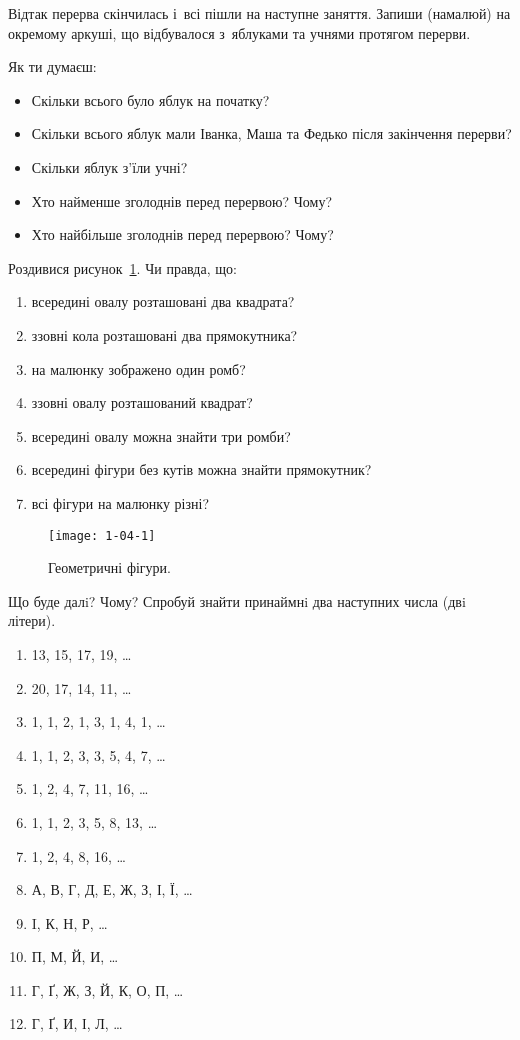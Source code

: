 Відтак перерва скінчилась і~всі пішли на наступне заняття.
Запиши (намалюй) на окремому аркуші, що відбувалося з~яблуками
та учнями протягом перерви.

Як ти думаєш:
\begin{itemize}
  \item Скільки всього було яблук на початку?
  \item Скільки всього яблук мали Іванка, Маша та Федько
  після закінчення перерви?
  \item Скільки яблук з'їли учні?
  \item Хто найменше зголоднів перед перервою? Чому?
  \item Хто найбільше зголоднів перед перервою? Чому?
\end{itemize}


\problem
Роздивися рисунок~\ref{fig:geom-figures}.
Чи правда, що:
\begin{enumerate}
  \item всередині овалу розташовані два квадрата?
  \item ззовні кола розташовані два прямокутника?
  \item на малюнку зображено один ромб?
  \item ззовні овалу розташований квадрат?
  \item всередині овалу можна знайти три ромби?
  \item всередині фігури без кутів можна знайти прямокутник?
  \item всі фігури на малюнку різні?
\end{enumerate}

\begin{figure}[ht]
  \centering
  \texttt{[image: 1-04-1]}
  \caption{Геометричні фігури.}
  \label{fig:geom-figures}
\end{figure}


\problem
Що буде далi? Чому?
Спробуй знайти принаймнi два наступних числа (двi літери).
\begin{enumerate}
  \item 13, 15, 17, 19, \ldots
  \item 20, 17, 14, 11, \ldots
  \item 1, 1, 2, 1, 3, 1, 4, 1, \ldots
  \item 1, 1, 2, 3, 3, 5, 4, 7, \ldots
  \item 1, 2, 4, 7, 11, 16, \ldots
  \item 1, 1, 2, 3, 5, 8, 13, \ldots
  \item 1, 2, 4, 8, 16, \ldots
  \item А, В, Г, Д, Е, Ж, З, І, Ї, \ldots
  \item I, К, Н, Р, \ldots
  \item П, М, Й, И, \ldots
  \item Г, Ґ, Ж, З, Й, К, О, П, \ldots
  \item {\sffamily Г, Ґ, И, І, Л,} \ldots
\end{enumerate}


